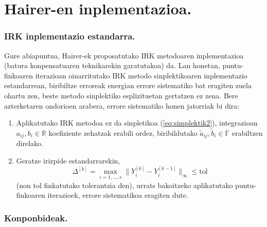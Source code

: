 \section{Hairer-en inplementazioa.}

\subsubsection*{IRK inplementazio estandarra.}

Gure abiapuntua, Hairer-ek \cite{Hairer2008} proposatutako IRK metodoaren inplementazioa (batura konpensatuaren teknikarekin \cite{Higham2002} garatutakoa) da.  
Lan honetan, puntu-finkoaren iterazioan oinarritutako IRK metodo sinplektikoaren  inplementazio estandarrean, biribiltze erroreak energian errore sistematiko bat eragiten zuela ohartu zen, beste metodo sinplektiko esplizituetan gertatzen ez zena. Bere azterketaren ondorioen arabera, errore sistematiko honen jatorriak bi dira:

\begin{enumerate}
 \item Aplikatutako IRK metodoa ez da sinpletikoa (\ref{eq:simplektik2}), integrazioan $a_{ij}, b_i \in \mathbb{R}$ koefiziente zehatzak erabili ordez, biribildutako $\tilde a_{ij},\tilde b_i \in \mathbb{F}$ erabiltzen direlako. 
\item Geratze irizpide estandarrarekin, 
\begin{equation}
\Delta ^{[k]} = \max_{i=1,\dots,s}\|Y_i^{[k]}-Y_i^{[k-1]}\|_{\infty} \leqslant \text{tol}
\end{equation}
(non tol finkatutako tolerantzia den), urrats bakoitzeko aplikatutako puntu-finkoaren iterazioek,  errore sistematikoa eragiten dute.

\end{enumerate}    

\subsubsection*{Konponbideak.}

